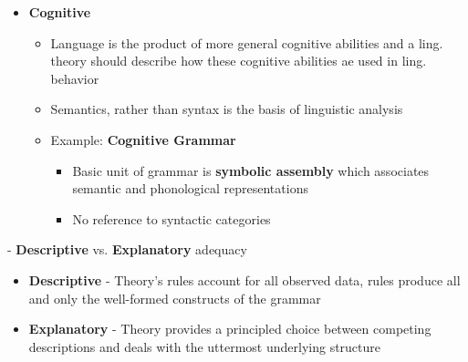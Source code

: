 \documentclass[11pt]{article}
\newenvironment{itemise}{
\begin{itemize}
  \setlength{\itemsep}{1pt}
  \setlength{\parskip}{0pt}
  \setlength{\parsep}{0pt}
}{\end{itemize}}
\begin{document}
\begin{itemise}
\begin{itemise}
   \item example: LFG and HPSG are highly lexical non-transformational grammars in which grammaticality is determined by satisfaction of simultaneous constraints (i.e. constraint-based)
    \begin{itemise}
     \item {\bf LFG}
      \begin{itemise}
       \item {\bf Lexical component} able to account for transformational phenomena
       \item {\bf c-structure}: phrase-structure tree serving as the basis for phonological interpretation
       \item {\bf f-structure}: hierarchical attribute-value matrix representing underlying grammatical relations (SUBJ, OBJ) and serving as the basis for semantic interpretation
      \end{itemise}
     \item {\bf HPSG}
      \begin{itemise}
       \item Seek to integrate syntax and semantics
       \item A system of signs (words, phrases, sentences) which are related to the signified (meaning)
       \item Signs are represented in feature structures consisting of attributes and values
      \end{itemise}
    \end{itemise}
  \end{itemise}
 \item {\bf Cognitive} 
  \begin{itemise}
   \item Language is the product of more general cognitive abilities and a ling. theory should describe how these cognitive abilities ae used in ling. behavior
   \item Semantics, rather than syntax is the basis of linguistic analysis
   \item Example: {\bf Cognitive Grammar}
    \begin{itemise}
      \item Basic unit of grammar is {\bf symbolic assembly} which associates semantic and phonological representations
      \item No reference to syntactic categories
    \end{itemise}
  \end{itemise}
\end{itemise}
- {\bf Descriptive} vs. {\bf Explanatory} adequacy
\begin{itemise}
 \item {\bf Descriptive} - Theory's rules account for all observed data, rules produce all and only the well-formed constructs of the grammar
 \item {\bf Explanatory} - Theory provides a principled choice between competing descriptions and deals with the uttermost underlying structure
\end{itemise}
\end{document}
